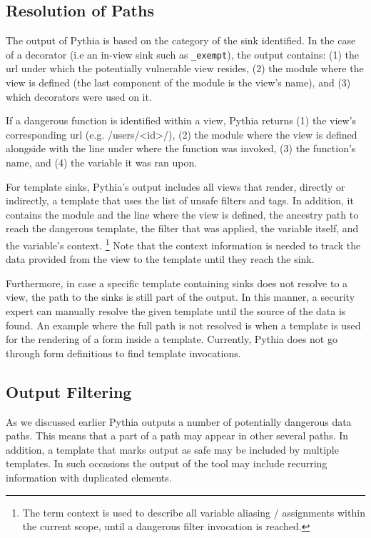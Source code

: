 \subsection{Resolution of Paths}
\label{sec:output}

The output of Pythia is based on the
category of the sink identified.
In the case of a decorator
(i.e an in-view sink such as
{\tt \@csrf\_exempt}),
the output contains:
(1) the {\sc url} under
which the potentially vulnerable
view resides,
(2) the module where the view is defined
(the last component of the module is the view's name), 
and (3) which decorators were used on it.

If a dangerous function is identified within a view,
Pythia returns (1) the view's corresponding
{\sc url} (e.g. /users/<id>/),
(2) the module where the view is defined
alongside with the line under where
the function was invoked,
(3) the function's name,
and (4) the variable it was ran upon.

For template sinks,
Pythia's output includes all views that render,
directly or indirectly,
a template that uses the list of
unsafe filters and tags.
In addition,
it contains the module and the line where
the view is defined,
the ancestry path to reach the dangerous template,
the filter that was applied,
the variable itself,
and the variable's context.
\footnote{The term context is used to describe all variable aliasing / assignments
within the current scope, until a dangerous filter invocation is reached.}
Note that the context information is needed
to track the data provided from the view to
the template until they reach the sink.

Furthermore,
in case a specific template containing sinks
does not resolve to a view,
the path to the sinks is still part of the output.
In this manner,
a security expert can manually resolve
the given template until the source
of the data is found.
An example where the full path is not
resolved is when a template is used
for the rendering of a form inside a template.
Currently,
Pythia does not go through form definitions
to find template invocations.

\subsection{Output Filtering}
\label{sec:filtering}

As we discussed earlier Pythia
outputs a number of potentially
dangerous data paths.
This means that a part of a path
may appear in other several paths.
In addition,
a template that marks output
as safe may be included by multiple
templates.
In such occasions the output of
the tool may include recurring information
with duplicated elements.

